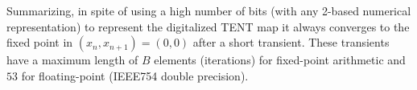 Summarizing, in spite of using a high number of bits (with any 2-based numerical representation) to represent the digitalized TENT map it always converges to the fixed point in $(x_n, x_{n+1})=(0, 0)$ after a short transient.
These transients have a maximum length of $B$ elements (iterations) for fixed-point arithmetic and $53$ for floating-point (IEEE754 double precision).